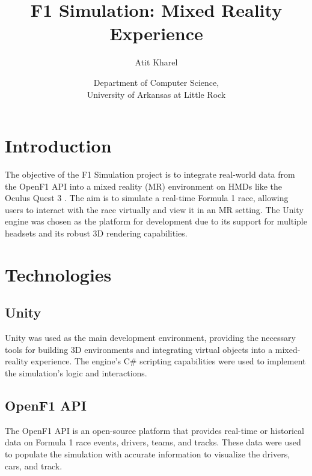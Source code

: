 \documentclass[
	a4paper, %
	10pt, %
	unnumberedsections, %
	twoside, %
]{LTJournalArticle}
\title{F1 Simulation: Mixed Reality Experience}
\author{Atit Kharel}
\date{\footnotesize Department of Computer Science, \\
University of Arkansas at Little Rock}
\begin{document}


\lstset{style=codestyle}

\maketitle

\section{Introduction}
The objective of the F1 Simulation project is to integrate real-world data from the OpenF1 API \autocite{godefroy_openf1} into a mixed reality (MR) environment on HMDs 
like the Oculus Quest 3 \autocite{oculus_quest_3}. The aim is to simulate a real-time Formula 1 race, allowing users to interact with the race virtually and view it in an 
MR setting. The Unity engine was chosen as the platform for development due to its support for multiple headsets and its robust 3D rendering capabilities.

\section{Technologies}
\subsection{Unity}
Unity was used as the main development environment, providing the necessary tools for building 3D environments and integrating virtual objects into a mixed-reality experience. The engine's C\# scripting capabilities were used to implement the simulation's logic and interactions.

\subsection{OpenF1 API}
The OpenF1 API is an open-source platform that provides real-time or historical data on Formula 1 race events, drivers, teams, and tracks. These data were used to populate the simulation with accurate information to visualize the drivers, cars, and track.
\end{document}
